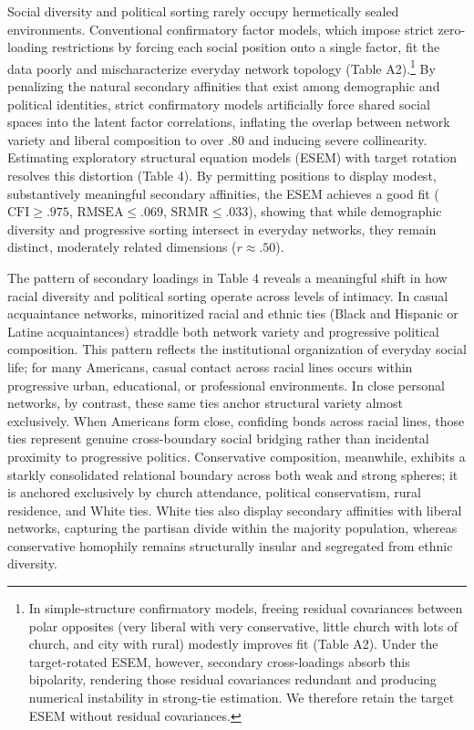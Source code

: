 \documentclass[
  12pt
]{article}
\begin{document}
Social diversity and political sorting rarely occupy hermetically sealed environments. Conventional confirmatory factor models, which impose strict zero-loading restrictions by forcing each social position onto a single factor, fit the data poorly and mischaracterize everyday network topology (Table A2).\footnote{In simple-structure confirmatory models, freeing residual covariances between polar opposites (very liberal with very conservative, little church with lots of church, and city with rural) modestly improves fit (Table A2). Under the target-rotated ESEM, however, secondary cross-loadings absorb this bipolarity, rendering those residual covariances redundant and producing numerical instability in strong-tie estimation. We therefore retain the target ESEM without residual covariances.} By penalizing the natural secondary affinities that exist among demographic and political identities, strict confirmatory models artificially force shared social spaces into the latent factor correlations, inflating the overlap between network variety and liberal composition to over .80 and inducing severe collinearity. Estimating exploratory structural equation models (ESEM) with target rotation resolves this distortion (Table 4). By permitting positions to display modest, substantively meaningful secondary affinities, the ESEM achieves a good fit ($\text{CFI} \ge .975$, $\text{RMSEA} \le .069$, $\text{SRMR} \le .033$), showing that while demographic diversity and progressive sorting intersect in everyday networks, they remain distinct, moderately related dimensions ($r \approx .50$).

The pattern of secondary loadings in Table 4 reveals a meaningful shift in how racial diversity and political sorting operate across levels of intimacy. In casual acquaintance networks, minoritized racial and ethnic ties (Black and Hispanic or Latine acquaintances) straddle both network variety and progressive political composition. This pattern reflects the institutional organization of everyday social life; for many Americans, casual contact across racial lines occurs within progressive urban, educational, or professional environments. In close personal networks, by contrast, these same ties anchor structural variety almost exclusively. When Americans form close, confiding bonds across racial lines, those ties represent genuine cross-boundary social bridging rather than incidental proximity to progressive politics. Conservative composition, meanwhile, exhibits a starkly consolidated relational boundary across both weak and strong spheres; it is anchored exclusively by church attendance, political conservatism, rural residence, and White ties. White ties also display secondary affinities with liberal networks, capturing the partisan divide within the majority population, whereas conservative homophily remains structurally insular and segregated from ethnic diversity.
\end{document}
